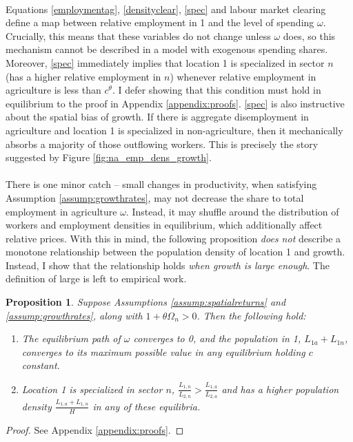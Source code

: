 \documentclass[]{article}
\theoremstyle{plain}
\newtheorem{prop}{Proposition}
\begin{document}
\paragraph*{}
Equations \eqref{employmentag}, \eqref{densityclear}, \eqref{spec} and labour market clearing define a map between relative employment in 1 and the level of spending $\omega$. Crucially, this means that these variables do not change unless $\omega$ does, so this mechanism cannot be described in a model with exogenous spending shares. Moreover, \eqref{spec} immediately implies that location 1 is specialized in sector $n$ (has a higher relative employment in $n$) whenever relative employment in agriculture is less than $c^{\theta}$. I defer showing that this condition must hold in equilibrium to the proof in Appendix \ref{appendix:proofs}. \eqref{spec} is also instructive about the spatial bias of growth. If there is aggregate disemployment in agriculture and location 1 is specialized in non-agriculture, then it mechanically absorbs a majority of those outflowing workers. This is precisely the story suggested by Figure \ref{fig:na_emp_dens_growth}. 
\paragraph*{}
There is one minor catch -- small changes in productivity, when satisfying Assumption \ref{assump:growthrates}, may not decrease the share to total employment in agriculture $\omega$. Instead, it may shuffle around the distribution of workers and employment densities in equilibrium, which additionally affect relative prices. With this in mind, the following proposition \textit{does not} describe a monotone relationship between the population density of location 1 and growth. Instead, I show that the relationship holds \textit{when growth is large enough}. The definition of large is left to empirical work.

\begin{prop}\label{thm:tradeprop}
Suppose Assumptions \ref{assump:spatialreturns} and \ref{assump:growthrates}, along with $1 + \theta\Omega_{n} >0$. Then the following hold:
\begin{enumerate}
	\item The equilibrium path of $\omega$ converges to 0, and the population in 1, $L_{1a} + L_{1n}$, converges to its maximum possible value in any equilibrium holding $c$ constant. 
	\item Location 1 is specialized in sector $n$, $\frac{L_{1,n}}{L_{2,n}} > \frac{L_{1,a}}{L_{2,a}}$ and has a higher population density $\frac{L_{1,a} + L_{1, n}}{H}$ in any of these equilibria. 
\end{enumerate} 
\end{prop}
\begin{proof}
	See Appendix \ref{appendix:proofs}.
\end{proof}
\end{document}
